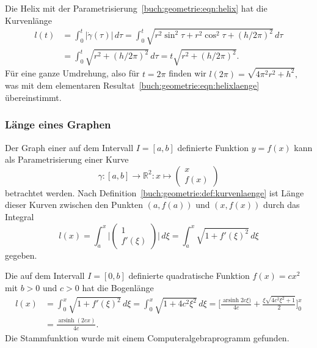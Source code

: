 \begin{beispiel}
Die Helix mit der Parametrisierung~\eqref{buch:geometrie:eqn:helix}
hat die Kurvenlänge
\begin{align*}
l(t)
&=
\int_0^t |\dot{\gamma}(\tau)|\,d\tau
=
\int_0^t \sqrt{r^2\sin^2 \tau + r^2\cos^2\tau + (h/2\pi)^2}\,d\tau
\\
&=
\int_0^t \sqrt{r^2 + (h/2\pi)^2}\,d\tau
=
t\sqrt{r^2+(h/2\pi)^2}.
\end{align*}
Für eine ganze Umdrehung, also für $t=2\pi$ finden wir
\(
l(2\pi) = \sqrt{4\pi^2 r^2 + h^2},
\)
was mit dem elementaren Resultat~\eqref{buch:geometrie:eqn:helixlaenge}
übereinstimmt.
\end{beispiel}

\subsubsection{Länge eines Graphen}
Der Graph einer auf dem Intervall $I=[a,b]$ definierte Funktion
$y=f(x)$ kann als Parametrisierung einer Kurve
\[
\gamma
\colon
[a,b] \to \mathbb{R}^2
:
x \mapsto \begin{pmatrix}x\\f(x)\end{pmatrix}
\]
betrachtet werden.
Nach Definition~\ref{buch:geometrie:def:kurvenlaenge}
ist Länge dieser Kurven zwischen den Punkten $(a,f(a))$ und $(x,f(x))$
durch das Integral
\[
l(x)
=
\int_a^x \biggl| \begin{pmatrix}1\\f'(\xi)\end{pmatrix}\biggr|\,d\xi
=
\int_a^x \sqrt{1+f'(\xi)^2}\,d\xi
\]
gegeben.

\begin{beispiel}
Die auf dem Intervall $I=[0,b]$ definierte quadratische Funktion $f(x)=cx^2$
mit $b>0$ und $c>0$ hat die Bogenlänge
\begin{align*}
l(x)
&=
\int_0^x \sqrt{1+f'(\xi)^2}\,d\xi
=
\int_0^x \sqrt{1+4c^2\xi^2}\,d\xi
=
\biggl[
\frac{ \operatorname{arsinh}2c\xi)}{4c} + \frac{\xi\sqrt{4c^2\xi^2+1}}{2}
\biggr]_0^x
\\
&=
\frac{ \operatorname{arsinh}(2cx)}{4c}.
\end{align*}
Die Stammfunktion wurde mit einem Computeralgebraprogramm gefunden.
\end{beispiel}

